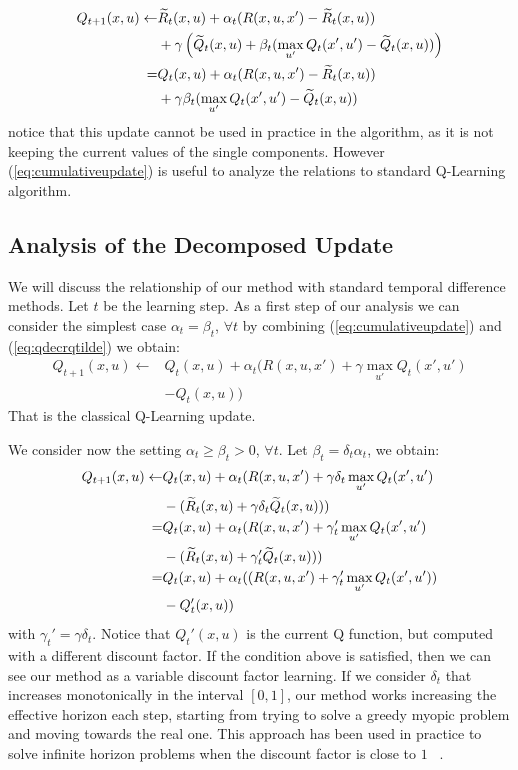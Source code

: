 \documentclass[conference]{IEEEtran}
\begin{document}
\begin{align}
Q_{t+1}(x,u)\leftarrow&\Rtilde_t(x,u)+\alpha_t(R(x,u,x')-\Rtilde_t(x,u)) \nonumber\\
  & +\gamma\left(\Qtilde_t(x,u)+\beta_t(\max_{u'}Q_t(x',u')-\Qtilde_t(x,u))\right) \nonumber\\
= & Q_t(x,u)+\alpha_t(R(x,u,x')-\Rtilde_t(x,u)) \nonumber\\
  & +\gamma\beta_t(\max_{u'}Q_t(x',u')-\Qtilde_t(x,u))
 \label{eq:cumulativeupdate}
\end{align}
notice that this update cannot be used in practice in the algorithm, as it is not keeping the current values of the single components. However (\ref{eq:cumulativeupdate}) is useful to analyze the relations to standard Q-Learning algorithm.

\subsection{Analysis of the Decomposed Update}
We will discuss the relationship of our method with standard temporal difference methods. Let $t$ be the learning step. As a first step of our analysis we can consider the simplest case $\alpha_t=\beta_t$, $\forall t$ by combining (\ref{eq:cumulativeupdate}) and (\ref{eq:qdecrqtilde}) we obtain:
\begin{align}
Q_{t+1}(x,u) \leftarrow & Q_t(x,u)+\alpha_t(R(x,u,x')+\gamma\max_{u'}Q_t(x',u')\nonumber\\
 & - Q_t(x,u))
\end{align}
That is the classical Q-Learning update. 

We consider now the setting $\alpha_t\geq\beta_t>0$, $\forall t$. Let $\beta_t=\delta_t\alpha_t$, we obtain:
\begin{align}
Q_{t+1}(x,u) \leftarrow & Q_t(x,u)+\alpha_t(R(x,u,x')+\gamma\delta_t \max_{u'}Q_t(x',u') \nonumber\\
  & -(\widetilde{R}_t(x,u)+\gamma\delta_t\widetilde{Q}_t(x,u))) \nonumber\\
= & Q_t(x,u)+\alpha_t(R(x,u,x')+\gamma_t'\max_{u'}Q_t(x',u') \nonumber\\
  & -(\widetilde{R}_t(x,u)+\gamma_t'\widetilde{Q}_t(x,u))) \nonumber\\
= & Q_t(x,u)+\alpha_t((R(x,u,x')+\gamma_t'\max_{u'}Q_t(x',u')) \nonumber\\
  & - Q_t'(x,u))
\end{align}
with $\gamma_t'=\gamma\delta_t$. Notice that $Q_t'(x,u)$ is the current Q function, but computed with a different discount factor. If the condition above is satisfied, then we can see our method as a variable discount factor learning. If we consider $\delta_t$ that increases monotonically in the interval $[0,1]$, our method works increasing the effective horizon each step, starting from trying to solve a greedy myopic problem and moving towards the real one. This approach has been used in practice to solve infinite horizon problems when the discount factor is close to $1$ ~\cite{crites1996improving, bao2008infinite, franccois2015discount}.
\end{document}
